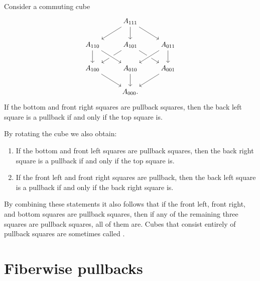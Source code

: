 \begin{lem}
Consider a commuting cube
\begin{equation*}
\begin{tikzcd}
& A_{111} \arrow[dl] \arrow[dr] \arrow[d] \\
A_{110} \arrow[d] & A_{101} \arrow[dl] \arrow[dr] & A_{011} \arrow[dl,crossing over] \arrow[d] \\
A_{100} \arrow[dr] & A_{010} \arrow[d] \arrow[from=ul,crossing over] & A_{001} \arrow[dl] \\
& A_{000}.
\end{tikzcd}
\end{equation*}
If the bottom and front right squares are pullback squares, then the back left square is a pullback if and only if the top square is.
\end{lem}

\begin{rmk}
By rotating the cube we also obtain:
\begin{enumerate}
\item If the bottom and front left squares are pullback squares, then the back right square is a pullback if and only if the top square is.
\item If the front left and front right squares are pullback, then the back left square is a pullback if and only if the back right square is.
\end{enumerate}
By combining these statements it also follows that if the front left, front right, and bottom squares are pullback squares, then if any of the remaining three squares are pullback squares, all of them are. Cubes that consist entirely of pullback squares are sometimes called .
\end{rmk}

\section{Fiberwise pullbacks}

